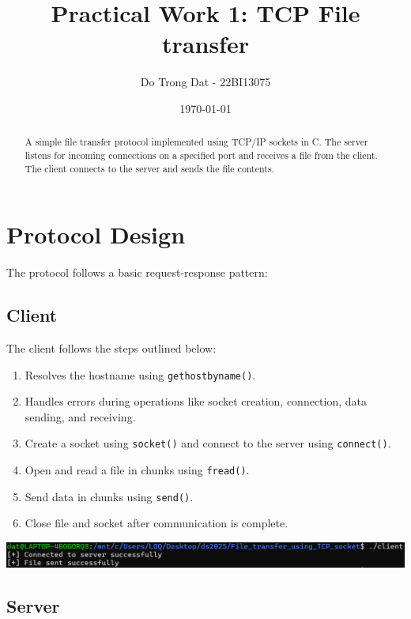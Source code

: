 \documentclass{article}
\begin{document}
\title{Practical Work 1: TCP File transfer}
\author{Do Trong Dat - 22BI13075}
\date{\today}

\maketitle

\begin{abstract}
A simple file transfer protocol implemented using TCP/IP sockets in C. The server listens for incoming connections on a specified port and receives a file from the client. The client connects to the server and sends the file contents.
\end{abstract}

\section{Protocol Design}

The protocol follows a basic request-response pattern:

\subsection{Client}

The client follows the steps outlined below:

\begin{enumerate}
    \item Resolves the hostname using \texttt{gethostbyname()}.
    \item Handles errors during operations like socket creation, connection, data sending, and receiving.
    \item Create a socket using \texttt{socket()} and connect to the server using \texttt{connect()}.
    \item Open and read a file in chunks using \texttt{fread()}.
    \item Send data in chunks using \texttt{send()}.
    \item Close file and socket after communication is complete.
\end{enumerate}

\includegraphics[width=1\linewidth]{client}

\subsection{Server}
\end{document}
